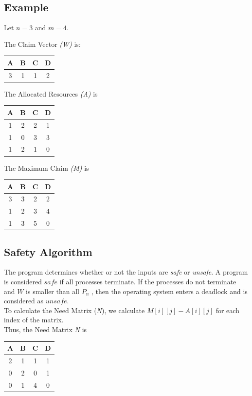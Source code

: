 \documentclass[letterpaper,oneside,10pt]{article}
\begin{document}
\subsection{Example}
Let $n = 3$ and $m = 4$.

The Claim Vector \textit{(W)} is:
\begin{left} \begin{tabular}{c c c c}
A & B & C & D	\\
\hline
3 & 1 & 1 & 2 \end{tabular}

The Allocated Resources \textit{(A)} is \begin{left} \begin{tabular}{c c c c}
A & B & C & D \\
\hline
1 & 2 & 2 & 1 \\
1 & 0 & 3 & 3 \\
1 & 2 & 1 & 0 \end{tabular}

The Maximum Claim \textit{(M)} is \begin{left} \begin{tabular}{c c c c}
A & B & C & D \\
\hline
3 & 3 & 2 & 2 \\
1 & 2 & 3 & 4 \\
1 & 3 & 5 & 0 \end{tabular}

\subsection{Safety Algorithm}
The program  determines whether or not the inputs are \textit{safe} or \textit{unsafe}. A program is considered $safe$ if all processes terminate. If the processes do not terminate and $W$ is smaller than all $P_n$ , then the operating system enters a deadlock and is considered as $unsafe$.\\
To calculate the Need Matrix (\textit{N}), we calculate $M[i][j] - A[i][j]$ for each index of the matrix.\\
Thus, the Need Matrix \textit{N} is \begin{left}\begin{tabular}{c c c c}
\\
A & B & C & D \\
\hline
2 & 1 & 1 & 1 \\
0 & 2 & 0 & 1 \\
0 & 1 & 4 & 0 \\
\end{tabular}
\\
\\


\end{left}
\end{left}
\end{left}
\end{left}
\end{document}

